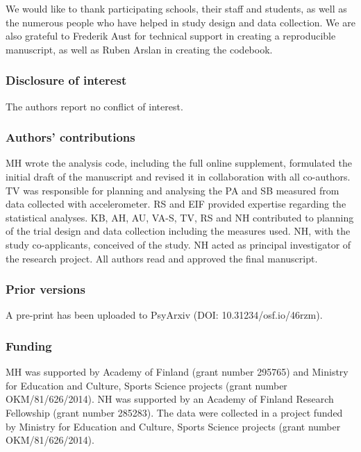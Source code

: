\documentclass[
  british,
  man,floatsintext]{apa6}
\begin{document}
We would like to thank participating schools, their staff and students, as well as the numerous people who have helped in study design and data collection. We are also grateful to Frederik Aust for technical support in creating a reproducible manuscript, as well as Ruben Arslan in creating the codebook.

\hypertarget{disclosure-of-interest}{%
\subsubsection{Disclosure of interest}\label{disclosure-of-interest}}

The authors report no conflict of interest.

\hypertarget{authors-contributions}{%
\subsubsection{Authors' contributions}\label{authors-contributions}}

MH wrote the analysis code, including the full online supplement, formulated the initial draft of the manuscript and revised it in collaboration with all co-authors. TV was responsible for planning and analysing the PA and SB measured from data collected with accelerometer. RS and EIF provided expertise regarding the statistical analyses. KB, AH, AU, VA-S, TV, RS and NH contributed to planning of the trial design and data collection including the measures used. NH, with the study co-applicants, conceived of the study. NH acted as principal investigator of the research project. All authors read and approved the final manuscript.

\hypertarget{prior-versions}{%
\subsubsection{Prior versions}\label{prior-versions}}

A pre-print has been uploaded to PsyArxiv (DOI: 10.31234/osf.io/46rzm).

\hypertarget{funding}{%
\subsubsection{Funding}\label{funding}}

MH was supported by Academy of Finland (grant number 295765) and Ministry for Education and Culture, Sports Science projects (grant number OKM/81/626/2014). NH was supported by an Academy of Finland Research Fellowship (grant number 285283). The data were collected in a project funded by Ministry for Education and Culture, Sports Science projects (grant number OKM/81/626/2014).
\end{document}
